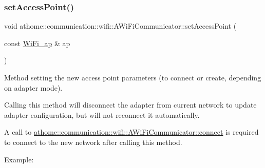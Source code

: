 \subsubsection{\texorpdfstring{set\+Access\+Point()}{setAccessPoint()}}
{\footnotesize\ttfamily void athome\+::communication\+::wifi\+::\+A\+Wi\+Fi\+Communicator\+::set\+Access\+Point (\begin{DoxyParamCaption}\item[{const \mbox{\hyperlink{structathome_1_1communication_1_1wifi_1_1s__wifi__access__point}{Wi\+Fi\+\_\+ap}} \&}]{ap }\end{DoxyParamCaption})}

Method setting the new access point parameters (to connect or create, depending on adapter mode).

Calling this method will disconnect the adapter from current network to update adapter configuration, but will not reconnect it automatically.

A call to \mbox{\hyperlink{classathome_1_1communication_1_1wifi_1_1_a_wi_fi_communicator_a309927109fbc19aa0fb2afb71d50bbf9}{athome\+::communication\+::wifi\+::\+A\+Wi\+Fi\+Communicator\+::connect}} is required to connect to the new network after calling this method.

Example\+:


